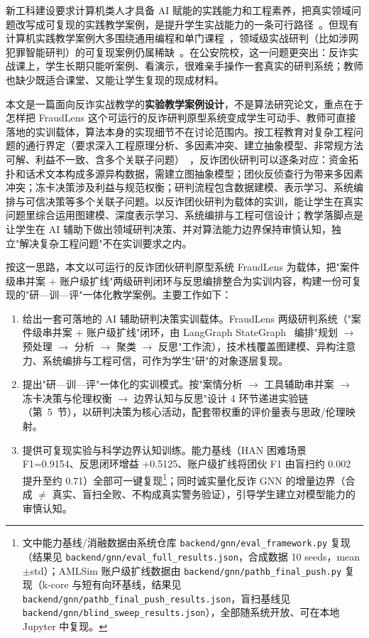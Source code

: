 \documentclass[12pt,a4paper]{ctexart}
\begin{document}
新工科建设要求计算机类人才具备 AI 赋能的实践能力和工程素养，把真实领域问题改写成可复现的实践教学案例，是提升学生实战能力的一条可行路径~\cite{edu_liqingyong2024,edu_zhangjin2024}。但现有计算机实践教学案例大多围绕通用编程和单门课程~\cite{edu_zhangjin2024}，领域级实战研判（比如涉网犯罪智能研判）的可复现案例仍属稀缺~\cite{edu_xiangga2022}。在公安院校，这一问题更突出：反诈实战课上，学生长期只能听案例、看演示，很难亲手操作一套真实的研判系统；教师也缺少既适合课堂、又能让学生复现的现成材料。

本文是一篇面向反诈实战教学的\textbf{实验教学案例设计}，不是算法研究论文，重点在于怎样把 FraudLens 这个可运行的反诈研判原型系统变成学生可动手、教师可直接落地的实训载体，算法本身的实现细节不在讨论范围内。按工程教育对复杂工程问题的通行界定（要求深入工程原理分析、多因素冲突、建立抽象模型、非常规方法可解、利益不一致、含多个关联子问题）~\cite{edu_jiangzongli2016,edu_xiangga2022}，反诈团伙研判可以逐条对应：资金拓扑和话术文本构成多源异构数据，需建立图抽象模型；团伙反侦查行为带来多因素冲突；冻卡决策涉及利益与规范权衡；研判流程包含数据建模、表示学习、系统编排与可信决策等多个关联子问题。以反诈团伙研判为载体的实训，能让学生在真实问题里综合运用图建模、深度表示学习、系统编排与工程可信设计；教学落脚点是让学生在 AI 辅助下做出领域研判决策、并对算法能力边界保持审慎认知，独立"解决复杂工程问题"不在实训要求之内。

按这一思路，本文以可运行的反诈团伙研判原型系统 FraudLens 为载体，把"案件级串并案 + 账户级扩线"两级研判闭环与反思编排整合为实训内容，构建一份可复现的"研—训—评"一体化教学案例。主要工作如下：
\begin{enumerate}
  \item 给出一套可落地的 AI 辅助研判决策实训载体。FraudLens 两级研判系统（"案件级串并案 + 账户级扩线"闭环，由 LangGraph StateGraph~\cite{langgraph2024} 编排"规划 $\to$ 预处理 $\to$ 分析 $\to$ 聚类 $\to$ 反思"工作流），技术栈覆盖图建模、异构注意力、系统编排与工程可信，可作为学生"研"的对象逐层复现。
  \item 提出"研—训—评"一体化的实训模式。按"案情分析 $\to$ 工具辅助串并案 $\to$ 冻卡决策与伦理权衡 $\to$ 边界认知与反思"设计 4 环节递进实验链（第~5~节），以研判决策为核心活动，配套带权重的评价量表与思政/伦理映射。
  \item 提供可复现实验与科学边界认知训练。能力基线（HAN 困难场景 F1=0.9154、反思闭环增益 +0.5125、账户级扩线将团伙 F1 由盲扫约 0.002 提升至约 0.71）全部可一键复现\footnote{文中能力基线/消融数据由系统仓库 \texttt{backend/gnn/eval\_framework.py} 复现（结果见 \texttt{backend/gnn/eval\_full\_results.json}，合成数据 10 seeds，mean$\pm$std）；AMLSim 账户级扩线数据由 \texttt{backend/gnn/pathb\_final\_push.py} 复现（k-core 与短有向环基线，结果见 \texttt{backend/gnn/pathb\_final\_push\_results.json}，盲扫基线见 \texttt{backend/gnn/blind\_sweep\_results.json}），全部随系统开放、可在本地 Jupyter 中复现。}；同时诚实量化反诈 GNN 的增量边界（合成 $\neq$ 真实、盲扫全败、不构成真实警务验证），引导学生建立对模型能力的审慎认知。
\end{enumerate}
\end{document}
